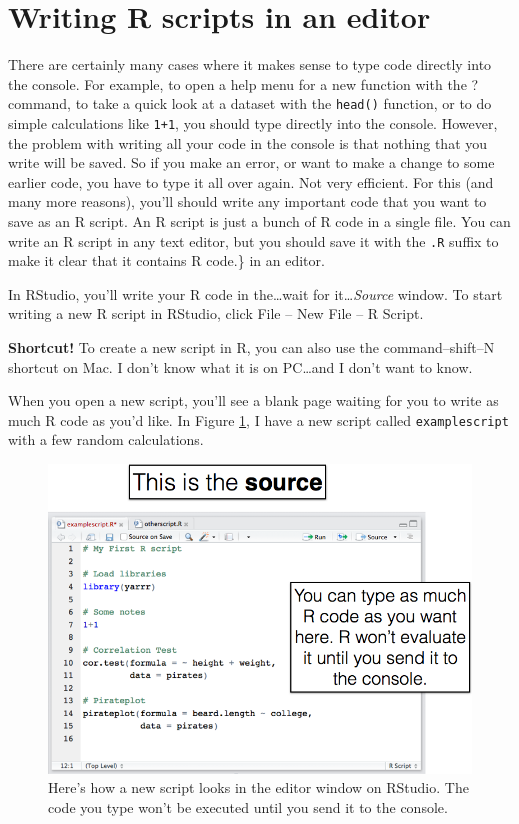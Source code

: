 \documentclass[]{book}
\theoremstyle{definition}
\theoremstyle{definition}
\theoremstyle{remark}
\begin{document}
\section{Writing R scripts in an
editor}\label{writing-r-scripts-in-an-editor}

There are certainly many cases where it makes sense to type code
directly into the console. For example, to open a help menu for a new
function with the ? command, to take a quick look at a dataset with the
\texttt{head()} function, or to do simple calculations like
\texttt{1+1}, you should type directly into the console. However, the
problem with writing all your code in the console is that nothing that
you write will be saved. So if you make an error, or want to make a
change to some earlier code, you have to type it all over again. Not
very efficient. For this (and many more reasons), you'll should write
any important code that you want to save as an R script. An R script is
just a bunch of R code in a single file. You can write an R script in
any text editor, but you should save it with the \texttt{.R} suffix to
make it clear that it contains R code.\} in an editor.

In RStudio, you'll write your R code in the\ldots{}wait for
it\ldots{}\emph{Source} window. To start writing a new R script in
RStudio, click File -- New File -- R Script.

\textbf{Shortcut!} To create a new script in R, you can also use the
command--shift--N shortcut on Mac. I don't know what it is on
PC\ldots{}and I don't want to know.

When you open a new script, you'll see a blank page waiting for you to
write as much R code as you'd like. In Figure \ref{fig:editor}, I have a
new script called \texttt{examplescript} with a few random calculations.

\begin{figure}

{\centering \includegraphics[width=0.75\linewidth]{images/sourcess} 

}

\caption{Here's how a new script looks in the editor window on RStudio. The code you type won't be executed until you send it to the console.}\label{fig:editor}
\end{figure}
\end{document}
